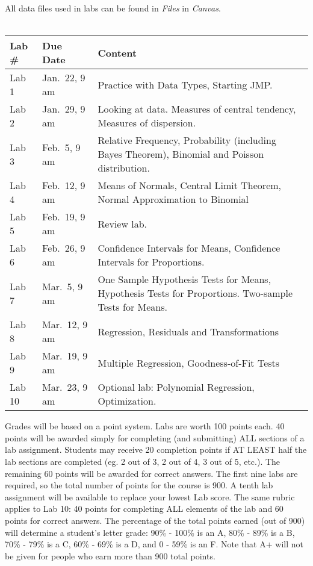 \documentclass[11pt]{article}
\begin{document}
\noindent All data files used in labs can be found in {\em Files} in {\em Canvas}.\\ 

\newpage
{}  \vspace{.05in}  \\ 
\indent \begin{tabular}{| l | l |p{10cm}|} \hline
Lab \# & Due Date & Content \\ \hline
Lab 1 & Jan.\ 22, 9 am &Practice with Data Types, Starting JMP. \\ \hline
Lab 2 & Jan.\ 29, 9 am & Looking at data. Measures of central tendency, Measures of dispersion. \\ \hline

Lab 3 & Feb.\ 5, 9 am &Relative Frequency, Probability (including Bayes Theorem), Binomial and Poisson distribution.\\ \hline

Lab 4 & Feb.\ 12, 9 am & Means of Normals, Central Limit Theorem, Normal Approximation to Binomial\\ \hline

Lab 5 & Feb.\ 19, 9 am & Review lab.\\ \hline

Lab 6 & Feb.\ 26, 9 am &Confidence Intervals for Means, Confidence Intervals for Proportions.\\ \hline

Lab 7 & Mar.\ 5, 9 am &One Sample Hypothesis Tests for Means, Hypothesis Tests for Proportions. Two-sample Tests for Means.\\ \hline

Lab 8&  Mar.\ 12, 9 am &Regression, Residuals and Transformations\\ \hline

Lab 9& Mar.\ 19, 9 am & Multiple Regression, Goodness-of-Fit Tests\\ \hline

Lab 10 & Mar.\ 23, 9 am & Optional lab: Polynomial Regression, Optimization.\\ \hline
\end{tabular}

\vspace{.3in}

 Grades will be based on a point
system.  Labs are worth 100 points each.  40 points will be awarded
simply for completing (and submitting) ALL sections of a lab
assignment.  Students may receive 20 completion points if AT LEAST
half the lab sections are completed (eg. 2 out of 3, 2 out of 4, 3 out
of 5, etc.). The remaining 60 points will be awarded for correct
answers.  The first nine labs are required, so the total number of
points for the course is 900. A tenth lab assignment will be available
to replace your lowest Lab score.  The same rubric applies to Lab 10:
40 points for completing ALL elements of the lab and 60 points for correct answers.  The percentage of the total points
earned (out of 900) will determine a student's letter grade: 90\% -
100\% is an A, 80\% - 89\% is a B, 70\% - 79\% is a C, 60\% - 69\% is
a D, and 0 - 59\% is an F.  Note that A+ will not be given for people
who earn more than 900 total points. \\
\end{document}
